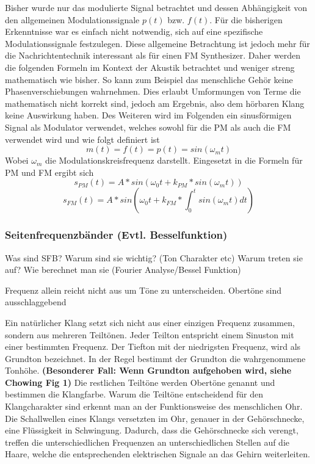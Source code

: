 Bisher wurde nur das modulierte Signal betrachtet und dessen Abhängigkeit von den allgemeinen Modulationssignale \(p(t)\) bzw. \(f(t)\). Für die bisherigen Erkenntnisse war es einfach nicht notwendig, sich auf eine spezifische Modulationssignale festzulegen. Diese allgemeine Betrachtung ist jedoch mehr für die Nachrichtentechnik interessant als für einen FM Synthesizer.
Daher werden die folgenden Formeln im Kontext der Akustik betrachtet und weniger streng mathematisch wie bisher. So kann zum Beispiel das menschliche Gehör keine Phasenverschiebungen wahrnehmen. Dies erlaubt Umformungen von Terme die mathematisch nicht korrekt sind, jedoch am Ergebnis, also dem hörbaren Klang keine Auswirkung haben. Des Weiteren wird im Folgenden ein sinusförmigen Signal als Modulator verwendet, welches sowohl für die PM als auch die FM verwendet wird und wie folgt definiert ist
\begin{equation}
m(t)=f(t)=p(t)=sin(\omega_m t)
\end{equation}
Wobei \(\omega_m\) die Modulationskreisfrequenz darstellt. Eingesetzt in die Formeln für PM und FM ergibt sich
\begin{equation}
s_{PM}(t)=A*sin(\omega_0t+k_{PM}*sin(\omega_m t))
\end{equation}
\begin{equation}
s_{FM}(t)=A*sin(\omega_0t+k_{FM}*\int_0^t{sin(\omega_m t)} dt)
\end{equation}

\subsubsection{Seitenfrequenzbänder (Evtl. Besselfunktion)}
Was sind SFB?
Warum sind sie wichtig? (Ton Charakter etc)
Warum treten sie auf?
Wie berechnet man sie (Fourier Analyse/Bessel Funktion)

Frequenz allein reicht nicht aus um Töne zu unterscheiden. Obertöne sind ausschlaggebend 


Ein natürlicher Klang setzt sich nicht aus einer einzigen Frequenz zusammen, sondern aus mehreren Teiltönen. Jeder Teilton entspricht einem Sinuston mit einer bestimmten Frequenz. Der Tiefton mit der niedrigsten Frequenz, wird als Grundton bezeichnet. In der Regel bestimmt der Grundton die wahrgenommene Tonhöhe. \textbf{(Besonderer Fall: Wenn Grundton aufgehoben wird, siehe Chowing Fig 1)} Die restlichen Teiltöne werden Obertöne genannt und bestimmen die Klangfarbe. Warum die Teiltöne entscheidend für den Klangcharakter sind erkennt man an der Funktionsweise des menschlichen Ohr. Die Schallwellen eines Klangs versetzten im Ohr, genauer in der Gehörschnecke, eine Flüssigkeit in Schwingung. Dadurch, dass die Gehörschnecke sich verengt, treffen die unterschiedlichen Frequenzen an unterschiedlichen Stellen auf die Haare, welche die entsprechenden elektrischen Signale an das Gehirn weiterleiten.




